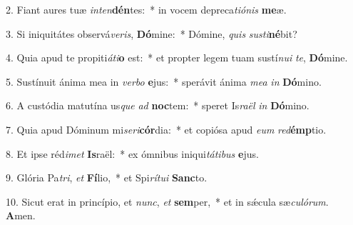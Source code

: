 2. Fiant aures tuæ \textit{in}\textit{ten}\textbf{dén}tes:~*  in vocem depreca\textit{ti}\textit{ó}\textit{nis} \textbf{me}æ.\

3. Si iniquitátes observá\textit{ve}\textit{ris}, \textbf{Dó}mine:~*  Dómine, \textit{quis} \textit{sus}\textit{ti}\textbf{né}bit?\

4. Quia apud te propiti\textit{á}\textit{ti}\textbf{o} est:~*  et propter legem tuam sustí\textit{nu}\textit{i} \textit{te}, \textbf{Dó}mine.\

5. Sustínuit ánima mea in \textit{ver}\textit{bo} \textbf{e}jus:~*  sperávit ánima \textit{me}\textit{a} \textit{in} \textbf{Dó}mino.\

6. A custódia matutína us\textit{que} \textit{ad} \textbf{noc}tem:~*  speret Is\textit{ra}\textit{ël} \textit{in} \textbf{Dó}mino.\

7. Quia apud Dóminum mi\textit{se}\textit{ri}\textbf{cór}dia:~*  et copiósa apud \textit{e}\textit{um} \textit{red}\textbf{émp}tio.\

8. Et ipse réd\textit{i}\textit{met} \textbf{Is}raël:~*  ex ómnibus iniqui\textit{tá}\textit{ti}\textit{bus} \textbf{e}jus.\

9. Glória Pa\textit{tri}, \textit{et} \textbf{Fí}lio,~*  et Spi\textit{rí}\textit{tu}\textit{i} \textbf{Sanc}to.\

10. Sicut erat in princípio, et \textit{nunc}, \textit{et} \textbf{sem}per,~*  et in sǽcula sæ\textit{cu}\textit{ló}\textit{rum}. \textbf{A}men.\


